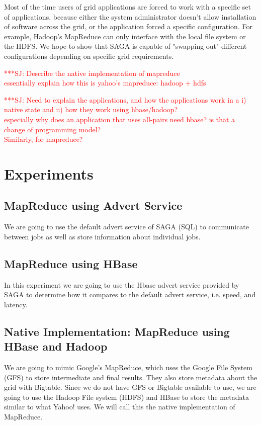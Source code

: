 \documentclass{rspublic}
\newcommand{\jhanote}[1]{ {\textcolor{red} { ***SJ: #1 }}}
\newcommand{\jhanote}[1]{}
\begin{document}
Most of the time users of grid applications are forced to work with a
specific set of applications, because either the system administrator
doesn't allow installation of software across the grid, or the
application forced a specific configuration.  For example, Hadoop's
MapReduce can only interface with the local file system or the HDFS.
We hope to show that SAGA is capable of "swapping out" different
configurations depending on specific grid requirements.

\jhanote{Describe the native implementation of mapreduce\\
  essentially explain how this is yahoo's mapreduce: hadoop + hdfs}

\jhanote{Need to explain the applications, and how the applications
  work in a i) native state and ii) how they work using hbase/hadoop? \\
  especially why does an application that uses all-pairs need hbase?
  is that a change of programming model?  \\ Similarly, for
  mapreduce?}


\section*{Experiments}

\subsection*{MapReduce using Advert Service}
We are going to use the default advert service of SAGA (SQL) to 
communicate between jobs as well as store information about 
individual jobs.

\subsection*{MapReduce using HBase}
In this experiment we are going to use the Hbase advert service 
provided by SAGA to determine how it compares to the default advert 
service, i.e. speed, and latency.

\subsection*{Native Implementation: MapReduce using HBase and Hadoop}
We are going to mimic Google's MapReduce, which uses the Google File System (GFS)
to store intermediate and final results.  They also store metadata about the grid 
with Bigtable.  Since we do not have GFS or Bigtable available to use, we are going 
to use the Hadoop File system (HDFS) and HBase to store the metadata similar to 
what Yahoo! uses.  We will call this the native implementation of MapReduce.
\end{document}
